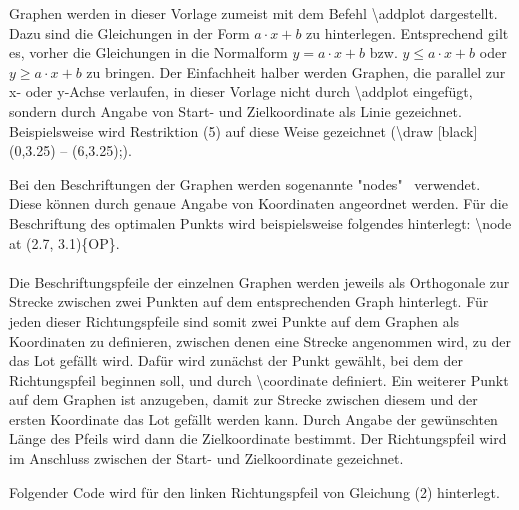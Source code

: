 \documentclass[13pt,a4paper, listof=entryprefix, bibliography=totocnumbered,toc=listofnumbered,lof=listofnumbered]{scrartcl}
\begin{document}
Graphen werden in dieser Vorlage zumeist mit dem Befehl \textbackslash addplot dargestellt. Dazu sind die Gleichungen in der Form $a\cdot x + b $ zu hinterlegen. Entsprechend gilt es, vorher die Gleichungen in die Normalform \quad $y = a \cdot x + b$ \quad bzw. \quad $y \leq a \cdot x + b$ \quad oder \quad $y \geq a \cdot x + b$ \quad zu bringen. Der Einfachheit halber werden Graphen, die parallel zur x- oder y-Achse verlaufen, in dieser Vorlage nicht durch \textbackslash addplot eingefügt, sondern durch Angabe von Start- und Zielkoordinate als Linie gezeichnet. Beispielsweise wird Restriktion (5) auf diese Weise gezeichnet (\textbackslash draw [black] (0,3.25) -- (6,3.25);).

Bei den Beschriftungen der Graphen werden sogenannte "nodes" \ verwendet. Diese können durch genaue Angabe von Koordinaten angeordnet werden. Für die Beschriftung des optimalen Punkts wird beispielsweise folgendes hinterlegt:  \textbackslash node at (2.7, 3.1)\{OP\}.\\ \\
Die Beschriftungspfeile der einzelnen Graphen werden jeweils als Orthogonale zur Strecke zwischen zwei Punkten auf dem entsprechenden Graph hinterlegt. Für jeden dieser Richtungspfeile sind somit zwei Punkte auf dem Graphen als Koordinaten zu definieren, zwischen denen eine Strecke angenommen wird, zu der das Lot gefällt wird. Dafür wird zunächst der Punkt gewählt, bei dem der Richtungspfeil beginnen soll, und durch \textbackslash coordinate definiert. Ein weiterer Punkt auf dem Graphen ist anzugeben, damit zur Strecke zwischen diesem und der ersten Koordinate das Lot gefällt werden kann. Durch Angabe der gewünschten Länge des Pfeils wird dann die Zielkoordinate bestimmt. Der Richtungspfeil wird im Anschluss zwischen der Start- und Zielkoordinate gezeichnet.

Folgender Code wird für den linken Richtungspfeil von Gleichung (2) hinterlegt. \\
\end{document}
